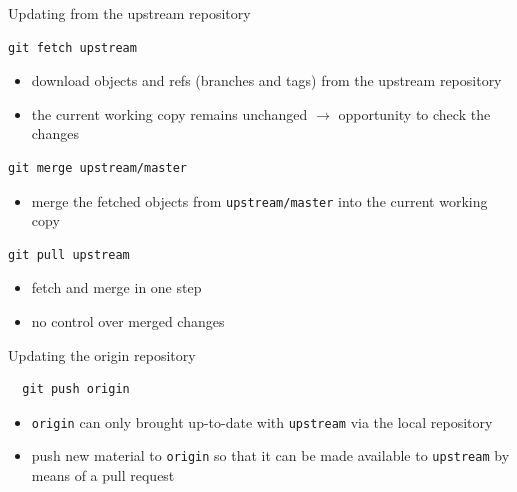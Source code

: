 \documentclass[svgnames]{beamer}
\begin{document}
\begin{frame}[fragile]{Updating from the upstream repository}
 \begin{lstlisting}
git fetch upstream
 \end{lstlisting}
 \begin{itemize}
  \item download objects and refs (branches and tags) from the upstream
         repository
  \item the current working copy remains unchanged $\rightarrow$ opportunity to check
      the changes
 \end{itemize}
 \begin{lstlisting}
git merge upstream/master
 \end{lstlisting}
 \begin{itemize}
  \item merge the fetched objects from \texttt{upstream/master} into the current
        working copy
 \end{itemize}

 \begin{lstlisting}
git pull upstream
 \end{lstlisting}
 \begin{itemize}
  \item fetch and merge in one step
  \item no control over merged changes
 \end{itemize}

\end{frame}

\begin{frame}[fragile]{Updating the origin repository}
 \begin{lstlisting}
  git push origin 
 \end{lstlisting}
 \begin{itemize}
  \item \texttt{origin} can only brought up-to-date with \texttt{upstream} via
      the local repository
  \item push new material to \texttt{origin} so that it can be made available
      to \texttt{upstream} by means of a pull request
 \end{itemize}
\end{frame}
\end{document}
